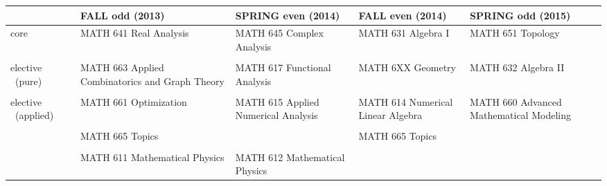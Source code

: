 \documentclass[12pt]{report}
\begin{document}
\pagestyle{empty}

\small
\begin{center}
\begin{tabular}{| p{1.6cm} || p{4.0cm} | p{4.0cm} | p{4.0cm} | p{4.0cm} |}

\hline
& \textbf{FALL odd (2013)} & \textbf{SPRING even (2014)} & \textbf{FALL even (2014)} & \textbf{SPRING odd (2015)} \\
\hline\hline
core & MATH 641 Real Analysis & MATH 645 Complex Analysis & MATH 631 Algebra I & MATH 651 Topology \\
&  &&&\\
\hline
elective 
~(pure) & MATH 663 Applied Combinatorics and Graph Theory & MATH 617 Functional Analysis & MATH 6XX Geometry & MATH 632 Algebra II \\
&  &&  & \\
\hline
elective 
~(applied) & MATH 661 Optimization & MATH 615 Applied Numerical Analysis & MATH 614 Numerical Linear Algebra & MATH 660 Advanced Mathematical Modeling \\
&  &&  & \\
\hline
& MATH 665 Topics && MATH 665 Topics&\\
&  &&  &\\
\hline
& MATH 611 Mathematical Physics & MATH 612 Mathematical Physics&& \\
\hline
\end{tabular}
\end{center}
\end{document}
